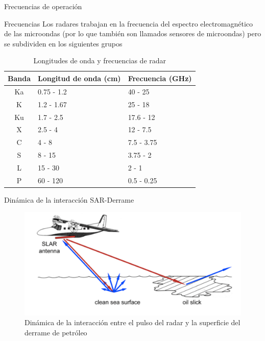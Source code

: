 \begin{frame}{Frecuencias de operación}
  \begin{block}{Frecuencias}
    Los radares trabajan en la frecuencia del espectro electromagnético de las microondas (por lo que también son llamados sensores de microondas) pero se subdividen en los siguientes grupos
  \end{block}

  \footnotesize
  \begin{table}
    \caption{Longitudes de onda y frecuencias de radar}
    \label{tab:longitudes_onda}
    \begin{center}
      \begin{tabular}[c]{c|l|l}
        \hline
        Banda & Longitud de onda (cm) & Frecuencia (GHz) \\
        \hline
        Ka & 0.75 - 1.2 & 40 - 25 \\
        K & 1.2 - 1.67 & 25 - 18 \\
        Ku & 1.7 - 2.5 & 17.6 - 12 \\
        X & 2.5 - 4 & 12 - 7.5 \\
        C & 4 - 8 & 7.5 - 3.75 \\
        S & 8 - 15 & 3.75 - 2 \\
        L & 15 - 30 & 2 - 1 \\
        P & 60 - 120 & 0.5 - 0.25 \\
        \hline
      \end{tabular}
    \end{center}
  \end{table}
\end{frame}
  


\begin{frame}{Dinámica de la interacción SAR-Derrame}
    \begin{figure}
        \centering
        \includegraphics[scale=0.2]{img/section_03/sar-petroleo.png}
        \caption{Dinámica de la interacción entre el pulso del radar y la superficie del derrame de petróleo}
        \label{fig:section_03_dinamica_sar_petroleo}
    \end{figure}
\end{frame}
